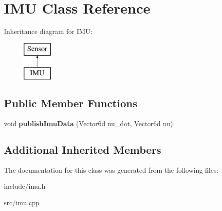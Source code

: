 \section{I\+MU Class Reference}
\label{class_i_m_u}
Inheritance diagram for I\+MU\+:\begin{figure}[H]
\begin{center}
\leavevmode
\includegraphics[height=2.000000cm]{class_i_m_u}
\end{center}
\end{figure}
\subsection*{Public Member Functions}
\begin{DoxyCompactItemize}
\item 
void {\bfseries publish\+Imu\+Data} (Vector6d nu\+\_\+dot, Vector6d nu)\label{class_i_m_u_a2d525fcbec09c226ec4c7df75f52a623}

\end{DoxyCompactItemize}
\subsection*{Additional Inherited Members}


The documentation for this class was generated from the following files\+:\begin{DoxyCompactItemize}
\item 
include/imu.\+h\item 
src/imu.\+cpp\end{DoxyCompactItemize}

